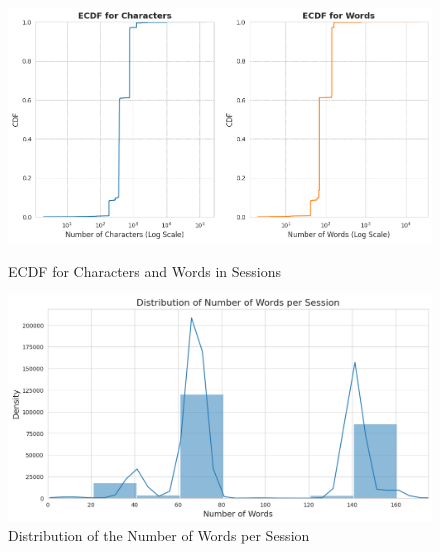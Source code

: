         \begin{figure}[h]
            \centering
            \begin{minipage}[c]{0.47\textwidth}
                \centering
                \includegraphics[width=\textwidth]{../figures/plots/section1/ecdf_for_characters_and_for_words.png}
                \caption{ECDF for Characters and Words in Sessions}
                \label{fig:ecdf_sessions}
            \end{minipage}
            \hfill
            \begin{minipage}[c]{0.47\textwidth}
                \centering
                \vspace{0.15cm}
                \includegraphics[width=\textwidth]{../figures/plots/section1/distribution_of_number_of_words_per_session_limited.png}
                \caption{Distribution of the Number of Words per Session}
                \label{fig:word_distribution}
            \end{minipage}
        \end{figure}
        
        \vspace{-0.35cm}

